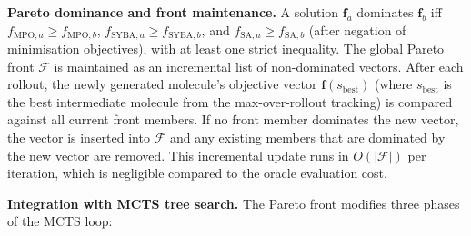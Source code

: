 \documentclass[jcim,article,layout=manuscript]{achemso}
\begin{document}
\textbf{Pareto dominance and front maintenance.} A solution $\mathbf{f}_a$
dominates $\mathbf{f}_b$ iff $f_{\text{MPO},a} \geq f_{\text{MPO},b}$,
$f_{\text{SYBA},a} \geq f_{\text{SYBA},b}$, and
$f_{\text{SA},a} \geq f_{\text{SA},b}$ (after negation of minimisation
objectives), with at least one strict inequality. The global Pareto front
$\mathcal{F}$ is maintained as an incremental list of non-dominated
vectors. After each rollout, the newly generated molecule's objective
vector $\mathbf{f}(s_{\text{best}})$ (where $s_{\text{best}}$ is the
best intermediate molecule from the max-over-rollout tracking) is compared
against all current front members. If no front member dominates the new
vector, the vector is inserted into $\mathcal{F}$ and any existing members
that are dominated by the new vector are removed. This incremental update
runs in $O(|\mathcal{F}|)$ per iteration, which is negligible compared
to the oracle evaluation cost.

\textbf{Integration with MCTS tree search.} The Pareto front modifies
three phases of the MCTS loop:
\end{document}
